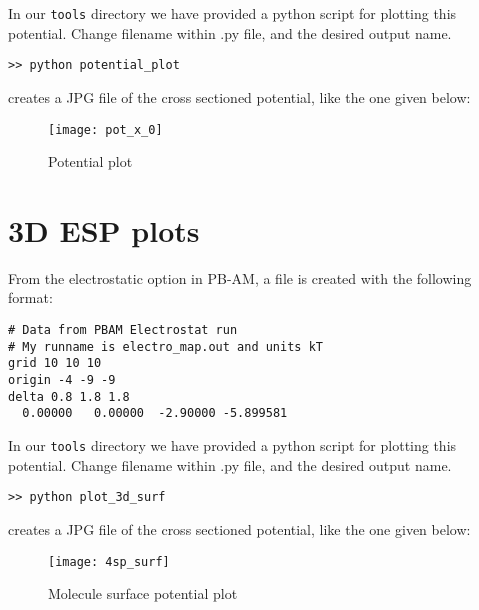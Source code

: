 \medskip

In our \texttt{tools} directory we have provided a python script for plotting this potential.
Change filename within .py file, and the desired output name.
\begin{lstlisting}[style = MyBash]
>> python potential_plot
\end{lstlisting}

\medskip

creates a JPG file of the cross sectioned potential, like the one given below:

\begin{figure}[!htbp]
  \centering
    \texttt{[image: pot\_x\_0]}
    \caption{Potential plot}
\end{figure}

\section{3D ESP plots}
From the electrostatic option in PB-AM, a file is created with the following format: \\

\begin{lstlisting}[style = MyBash]
# Data from PBAM Electrostat run
# My runname is electro_map.out and units kT
grid 10 10 10
origin -4 -9 -9
delta 0.8 1.8 1.8
  0.00000   0.00000  -2.90000 -5.899581 
\end{lstlisting}

\medskip

In our \texttt{tools} directory we have provided a python script for plotting this potential.
Change filename within .py file, and the desired output name.
\begin{lstlisting}[style = MyBash]
>> python plot_3d_surf
\end{lstlisting}

\medskip

creates a JPG file of the cross sectioned potential, like the one given below:

\begin{figure}[!htbp]
  \centering
    \texttt{[image: 4sp\_surf]}
    \caption{Molecule surface potential plot}
\end{figure}


